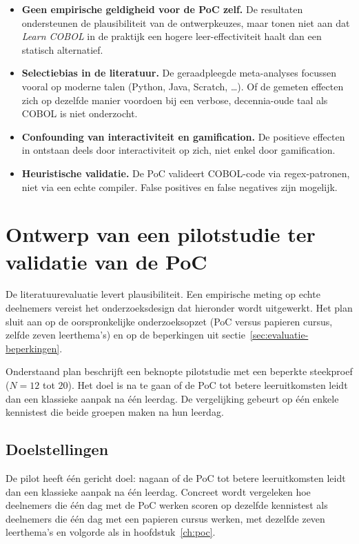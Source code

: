 \begin{itemize}
    \item \textbf{Geen empirische geldigheid voor de PoC zelf.} De resultaten ondersteunen de plausibiliteit van de ontwerpkeuzes, maar tonen niet aan dat \textit{Learn COBOL} in de praktijk een hogere leer-effectiviteit haalt dan een statisch alternatief.
    \item \textbf{Selectiebias in de literatuur.} De geraadpleegde meta-analyses focussen vooral op moderne talen (Python, Java, Scratch, \ldots). Of de gemeten effecten zich op dezelfde manier voordoen bij een verbose, decennia-oude taal als COBOL is niet onderzocht.
    \item \textbf{Confounding van interactiviteit en gamification.} De positieve effecten in \textcite{Zhan2022} ontstaan deels door interactiviteit op zich, niet enkel door gamification.
    \item \textbf{Heuristische validatie.} De PoC valideert COBOL-code via regex-patronen, niet via een echte compiler. False positives en false negatives zijn mogelijk.
\end{itemize}

\section{Ontwerp van een pilotstudie ter validatie van de PoC}%
\label{sec:evaluatie-pilotstudie}

De literatuurevaluatie levert plausibiliteit. Een empirische meting op echte deelnemers vereist het onderzoeksdesign dat hieronder wordt uitgewerkt.
Het plan sluit aan op de oorspronkelijke onderzoeksopzet (PoC versus papieren cursus, zelfde zeven leerthema's) en op de beperkingen uit sectie~\ref{sec:evaluatie-beperkingen}.

Onderstaand plan beschrijft een beknopte pilotstudie met een beperkte steekproef (\(N = 12\) tot \(20\)).
Het doel is na te gaan of de PoC tot betere leeruitkomsten leidt dan een klassieke aanpak na één leerdag.
De vergelijking gebeurt op één enkele kennistest die beide groepen maken na hun leerdag.

\subsection{Doelstellingen}

De pilot heeft één gericht doel: nagaan of de PoC tot betere leeruitkomsten leidt dan een klassieke aanpak na één leerdag.
Concreet wordt vergeleken hoe deelnemers die één dag met de PoC werken scoren op dezelfde kennistest als deelnemers die één dag met een papieren cursus werken, met dezelfde zeven leerthema's en volgorde als in hoofdstuk~\ref{ch:poc}.

